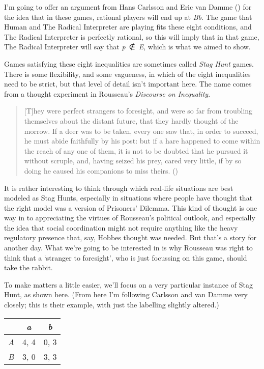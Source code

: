 \documentclass[
  11pt,
  letterpaper,
  DIV=11,
  numbers=noendperiod,
  twoside]{scrartcl}
\begin{document}
I'm going to offer an argument from Hans Carlsson and Eric van Damme
() for the idea that in these
games, rational players will end up at \emph{Bb}. The game that Human
and The Radical Interpreter are playing fits these eight conditions, and
The Radical Interpreter is perfectly rational, so this will imply that
in that game, The Radical Interpreter will say that \emph{p}~∉~\emph{E},
which is what we aimed to show.

Games satisfying these eight inequalities are sometimes called
\emph{Stag Hunt} games. There is some flexibility, and some vagueness,
in which of the eight inequalities need to be strict, but that level of
detail isn't important here. The name comes from a thought experiment in
Rousseau's \emph{Discourse on Inequality}.

\begin{quote}
{[}T{]}hey were perfect strangers to foresight, and were so far from
troubling themselves about the distant future, that they hardly thought
of the morrow. If a deer was to be taken, every one saw that, in order
to succeed, he must abide faithfully by his post: but if a hare happened
to come within the reach of any one of them, it is not to be doubted
that he pursued it without scruple, and, having seized his prey, cared
very little, if by so doing he caused his companions to miss theirs.
()
\end{quote}

It is rather interesting to think through which real-life situations are
best modeled as Stag Hunts, especially in situations where people have
thought that the right model was a version of Prisoners' Dilemma. This
kind of thought is one way in to appreciating the virtues of Rousseau's
political outlook, and especially the idea that social coordination
might not require anything like the heavy regulatory presence that, say,
Hobbes thought was needed. But that's a story for another day. What
we're going to be interested in is why Rousseau was right to think that
a `stranger to foresight', who is just focussing on this game, should
take the rabbit.

To make matters a little easier, we'll focus on a very particular
instance of Stag Hunt, as shown here. (From here I'm following Carlsson
and van Damme very closely; this is their example, with just the
labelling slightly altered.)

\begin{longtable}[]{@{}lcc@{}}
\toprule\noalign{}
& \emph{a} & \emph{b} \\
\midrule\noalign{}
\endhead
\bottomrule\noalign{}
\endlastfoot
\emph{A} & 4, 4 & 0, 3 \\
\emph{B} & 3, 0 & 3, 3 \\
\end{longtable}
\end{document}
